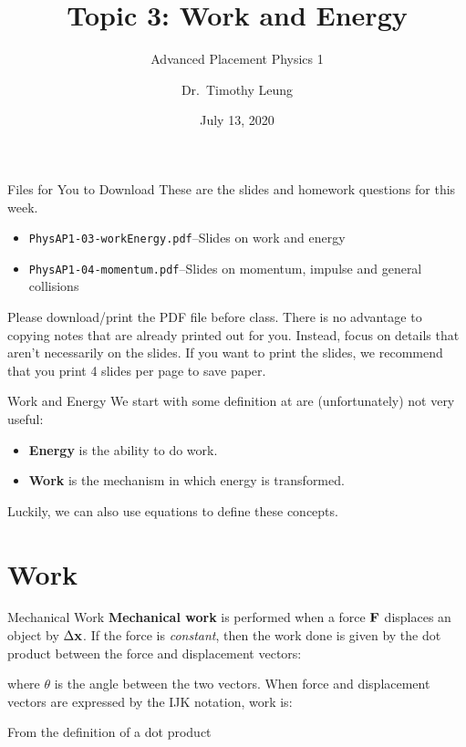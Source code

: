 \documentclass[12pt,compress,aspectratio=169]{beamer}
\title{Topic 3: Work and Energy}
\subtitle{Advanced Placement Physics 1}
\author[TML]{Dr.\ Timothy Leung}
\institute{Olympiads School}
\date{July 13, 2020}
\newcommand{\mb}[1]{\ensuremath\mathbf{#1}}
\newcommand{\eq}[2]{\vspace{#1}{\Large\begin{displaymath}#2\end{displaymath}}}
\begin{document}
\begin{frame}
  \maketitle
\end{frame}

\begin{frame}{Files for You to Download}
  These are the slides and homework questions for this week.
  \begin{itemize}
  \item\texttt{PhysAP1-03-workEnergy.pdf}--Slides on work and energy
  \item\texttt{PhysAP1-04-momentum.pdf}--Slides on momentum, impulse and
    general collisions
  \end{itemize}
  Please download/print the PDF file before class. There is no advantage to
  copying notes that are already printed out for you. Instead, focus on details
  that aren't necessarily on the slides. If you want to print the slides, we
  recommend that you print 4 slides per page to save paper.
\end{frame}



\begin{frame}{Work and Energy}
  We start with some definition at are (unfortunately) not very useful:
  \begin{itemize}
    \item \textbf{Energy} is the ability to do work.
    \item \textbf{Work} is the mechanism in which energy is transformed.
  \end{itemize}
  Luckily, we can also use equations to define these concepts.
\end{frame}


\section{Work}

\begin{frame}{Mechanical Work}
  \textbf{Mechanical work} is performed when a force $\mb{F}$ displaces an
  object by $\Delta \mb{x}$. If the force is \emph{constant}, then the work
  done is given by the dot product between the force and displacement vectors:

  \eq{-.2in}{
    \boxed{W=\mb{F}\cdot\Delta\mb{x}}
    \quad\text{\normalsize or}\quad
    \boxed{W=|\mb{F}||\mb{\Delta x}|\cos\theta}
  }

  \vspace{-.15in}where $\theta$ is the angle between the two vectors. When
  force and displacement vectors are expressed by the IJK notation, work is:

  \eq{-.2in}{
    W=F_x\Delta x+F_y\Delta y+F_z\Delta z
  }

  From the definition of a dot product
\end{frame}
\end{document}
